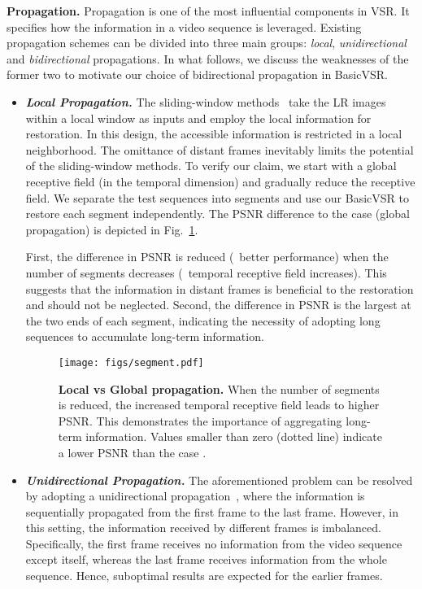 \documentclass[final]{cvpr}
\begin{document}
\vspace{0.2cm}
\noindent\textbf{Propagation.}
Propagation is one of the most influential components in VSR. It specifies how the information in a video sequence is leveraged. Existing propagation schemes can be divided into three main groups: \textit{local}, \textit{unidirectional} and \textit{bidirectional} propagations. In what follows, we discuss the weaknesses of the former two to motivate our choice of bidirectional propagation in BasicVSR.
\begin{itemize}
	\item \textbf{\textit{Local Propagation.}}
	      The sliding-window methods~\cite{haris2019recurrent,isobe2020video,wang2019edvr} take the LR images within a local window as inputs and employ the local information for restoration. In this design, the accessible information is restricted in a local neighborhood. The omittance of distant frames inevitably limits the potential of the sliding-window methods. To verify our claim, we start with a global receptive field (in the temporal dimension) and gradually reduce the receptive field. We separate the test sequences into  segments and use our \mbox{BasicVSR} to restore each segment independently. The PSNR difference to the case  (global propagation) is depicted in Fig.~\ref{fig:segment}.

	      First, the difference in PSNR is reduced (\ie~better performance) when the number of segments decreases (\ie~temporal receptive field increases). This suggests that the information in distant frames is beneficial to the restoration and should not be neglected. Second, the difference in PSNR is the largest at the two ends of each segment, indicating the necessity of adopting long sequences to accumulate long-term information.\vspace{0.3cm}
\begin{figure}[!t]
		      \begin{center}
			      \texttt{[image: figs/segment.pdf]}
			      \caption{\textbf{Local vs Global propagation.} When the number of segments  is reduced, the increased temporal receptive field leads to higher PSNR. This demonstrates the importance of aggregating long-term information. Values smaller than zero (dotted line) indicate a lower PSNR than the case .}
			      \vspace{-0.4cm}
			      \label{fig:segment}
		      \end{center}
	      \end{figure}
\item \textit{\textbf{Unidirectional Propagation.}}
	      The aforementioned problem can be resolved by adopting a unidirectional propagation~\cite{fuoli2019efficient,isobe2020video1,isobe2020revisiting,sajjadi2018frame}, where the information is sequentially propagated from the first frame to the last frame. However, in this setting, the information received by different frames is imbalanced. Specifically, the first frame receives no information from the video sequence except itself, whereas the last frame receives information from the whole sequence. Hence, suboptimal results are expected for the earlier frames.


\end{itemize}
\end{document}
